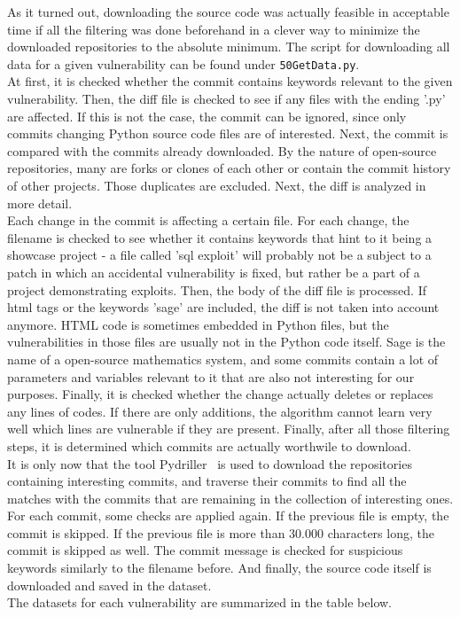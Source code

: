 \documentclass[
	a4paper,
	pagesize,
	pdftex,
	12pt,
	twoside, %
	BCOR=5mm, %
	ngerman,
	fleqn,
	final,
	]{scrartcl}
\begin{document}
As it turned out, downloading the source code was actually feasible in acceptable time if all the filtering was done beforehand in a clever way to minimize the downloaded repositories to the absolute minimum. The script for downloading all data for a given vulnerability can be found under \texttt{50GetData.py}.\\
At first, it is checked whether the commit contains keywords relevant to the given vulnerability. Then, the diff file is checked to see if any files with the ending '.py' are affected. If this is not the case, the commit can be ignored, since only commits changing Python source code files are of interested. Next, the commit is compared with the commits already downloaded. By the nature of open-source repositories, many are forks or clones of each other or contain the commit history of other projects. Those duplicates are excluded. Next, the diff is analyzed in more detail.\\
Each change in the commit is affecting a certain file. For each change, the filename is checked to see whether it contains keywords that hint to it being a showcase project - a file called 'sql exploit' will probably not be a subject to a patch in which an accidental vulnerability is fixed, but rather be a part of a project demonstrating exploits. Then, the body of the diff file is processed. If html tags or the keywords 'sage' are included, the diff is not taken into account anymore. HTML code is sometimes embedded in Python files, but the vulnerabilities in those files are usually not in the Python code itself. Sage is the name of a open-source mathematics system, and some commits contain a lot of parameters and variables relevant to it that are also not interesting for our purposes. Finally, it is checked whether the change actually deletes or replaces any lines of codes. If there are only additions, the algorithm cannot learn very well which lines are vulnerable if they are present. Finally, after all those filtering steps, it is determined which commits are actually worthwile to download.\\
It is only now that the tool Pydriller~\cite{Spadini.2018} is used to download the repositories containing interesting commits, and traverse their commits to find all the matches with the commits that are remaining in the collection of interesting ones. For each commit, some checks are applied again. If the previous file is empty, the commit is skipped. If the previous file is more than 30.000 characters long, the commit is skipped as well. The commit message is checked for suspicious keywords similarly to the filename before. And finally, the source code itself is downloaded and saved in the dataset. \\
The datasets for each vulnerability are summarized in the table below.
\end{document}
